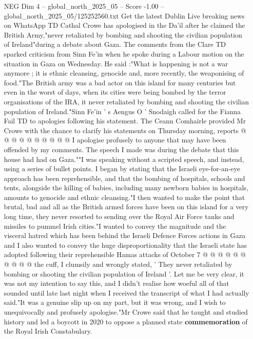 \begin{textsample}{NEG Dim 4 – global\_north\_2025\_05 – Score -1.00 – global\_north\_2025\_05/125252560.txt}  \label{ex:f4_neg_241}
Get the latest Dublin Live breaking news on WhatsApp TD Cathal Crowe has apologised in the Da'il after he claimed the British Army,"never retaliated by bombing and shooting the civilian population of Ireland"during a debate about Gaza.
The comments from the Clare TD sparked criticism from Sinn Fe'in when he spoke during a Labour motion on the situation in Gaza on Wednesday.
He said :"What is happening is not a war anymore ; it is ethnic cleansing, genocide and, more recently, the weaponising of food."The British army was a bad actor on this island for many centuries but even in the worst of days, when its cities were being bombed by the terror organisations of the IRA, it never retaliated by bombing and shooting the civilian population of Ireland."Sinn Fe'in ' s Aengus O ' Snodaigh called for the Fianna Fail TD to apologies following his statement.
The Ceann Comhairle provided Mr Crowe with the chance to clarify his statements on Thursday morning, reports @ @ @ @ @ @ @ @ @ @ I apologise profusely to anyone that may have been offended by my comments.
The speech I made was during the debate that this house had had on Gaza.""I was speaking without a scripted speech, and instead, using a series of bullet points.
I began by stating that the Israeli eye-for-an-eye approach has been reprehensible, and that the bombing of hospitals, schools and tents, alongside the killing of babies, including many newborn babies in hospitals, amounts to genocide and ethnic cleansing."I then wanted to make the point that brutal, bad and all as the British armed forces have been on this island for a very long time, they never resorted to sending over the Royal Air Force tanks and missiles to pummel Irish cities."I wanted to convey the magnitude and the visceral hatred which has been behind the Israeli Defence Forces actions in Gaza and I also wanted to convey the huge disproportionality that the Israeli state has adopted following their reprehensible Hamas attacks of October 7 @ @ @ @ @ @ @ @ @ @ the cuff, I clumsily and wrongly stated, ' They never retaliated by bombing or shooting the civilian population of Ireland '.
Let me be very clear, it was not my intention to say this, and I didn't realise how woeful all of that sounded until late last night when I received the transcript of what I had actually said."It was a genuine slip up on my part, but it was wrong, and I wish to unequivocally and profusely apologise."Mr Crowe said that he taught and studied history and led a boycott in 2020 to oppose a planned state \textbf{commemoration} of the Royal Irish Constabulary.

\end{textsample}
